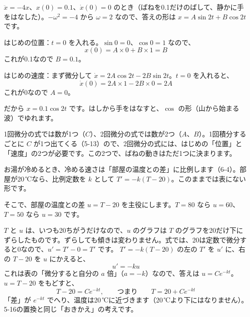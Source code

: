 $\ddot{x}=-4x$、$x(0)=0.1$、$\dot{x}(0)=0$ のとき（ばねを0.1だけのばして、静かに手をはなした）。$-\omega^2=-4$ から $\omega=2$ なので、答えの形は $x=A\sin2t+B\cos2t$ です。
\begin{enumerate}[label={\bkcircled[bkTheme]{\arabic*}}, leftmargin=2.4\zw, itemsep=1pt, topsep=2pt]
\item はじめの位置：$t=0$ を入れる。$\sin0=0$、$\cos0=1$ なので、
\[ x(0)=A\times0+B\times1=B \]
これが0.1なので $B=0.1$。
\item はじめの速度：まず微分して $\dot{x}=2A\cos2t-2B\sin2t$。$t=0$ を入れると、
\[ \dot{x}(0)=2A\times1-2B\times0=2A \]
これが0なので $A=0$。
\end{enumerate}
だから $x=0.1\cos2t$ です。はしから手をはなすと、$\cos$ の形（山から始まる波）でゆれます。

\noindent 1回微分の式では数が1つ（$C$）、2回微分の式では数が2つ（$A$、$B$）。1回積分するごとに $C$ が1つ出てくる（5-13）ので、2回微分の式には、はじめの「位置」と「速度」の2つが必要です。この2つで、ばねの動きはただ1つに決まります。


\label{bk:5-18:zurasu}お湯が冷めるとき、冷める速さは「部屋の温度との差」に比例します（6-4）。部屋が20\,℃なら、比例定数を $k$ として $T'=-k(T-20)$。このままでは表にない形です。

そこで、部屋の温度との差 $u=T-20$ を主役にします。$T=80$ なら $u=60$、$T=50$ なら $u=30$ です。
\begin{bkfigure}
\end{bkfigure}
$T$ と $u$ は、いつも20ちがうだけなので、$u$ のグラフは $T$ のグラフを20だけ下にずらしたものです。ずらしても傾きは変わりません。式では、20は定数で微分すると0なので、$u'=T'-0=T'$ です。
$T'=-k(T-20)$ の左の $T'$ を $u'$ に、右の $T-20$ を $u$ にかえると、
\[ u'=-ku \]
これは表の「微分すると自分の $a$ 倍」（$a=-k$）なので、答えは $u=Ce^{-kt}$。$u=T-20$ をもどすと、
\[ T-20=Ce^{-kt},\qquad\text{つまり}\qquad T=20+Ce^{-kt} \]
「差」が $e^{-kt}$ でへり、温度は20\,℃に近づきます（20\,℃より下にはなりません）。5-16の置換と同じ「おきかえ」の考えです。

